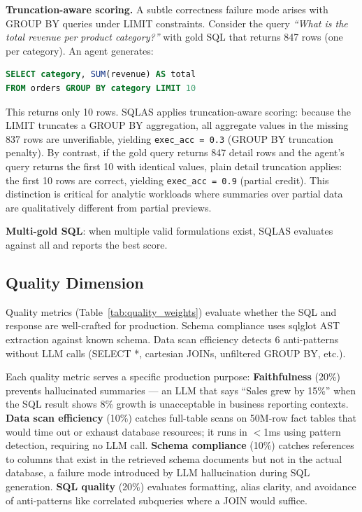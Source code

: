 \documentclass[conference]{IEEEtran}
\begin{document}
\textbf{Truncation-aware scoring.}
A subtle correctness failure mode arises with GROUP BY queries under
LIMIT constraints. Consider the query \emph{``What is the total revenue
per product category?''} with gold SQL that returns 847 rows (one per
category). An agent generates:
\begin{lstlisting}[language=SQL,basicstyle=\scriptsize\ttfamily]
SELECT category, SUM(revenue) AS total
FROM orders GROUP BY category LIMIT 10
\end{lstlisting}
This returns only 10 rows. SQLAS applies truncation-aware scoring:
because the LIMIT truncates a GROUP BY aggregation, all aggregate values
in the missing 837 rows are unverifiable, yielding \texttt{exec\_acc = 0.3}
(GROUP BY truncation penalty). By contrast, if the gold query returns
847 detail rows and the agent's query returns the first 10 with identical
values, plain detail truncation applies: the first 10 rows are correct,
yielding \texttt{exec\_acc = 0.9} (partial credit).
This distinction is critical for analytic workloads where summaries over
partial data are qualitatively different from partial previews.

\textbf{Multi-gold SQL}: when multiple valid formulations exist, SQLAS
evaluates against all and reports the best score.

\subsection{Quality Dimension}

Quality metrics (Table~\ref{tab:quality_weights}) evaluate whether the SQL
and response are well-crafted for production.
Schema compliance uses sqlglot AST extraction against known schema.
Data scan efficiency detects 6 anti-patterns without LLM calls
(SELECT *, cartesian JOINs, unfiltered GROUP BY, etc.).

Each quality metric serves a specific production purpose:
\textbf{Faithfulness} (20\%) prevents hallucinated summaries --- an LLM
that says ``Sales grew by 15\%'' when the SQL result shows 8\% growth is
unacceptable in business reporting contexts.
\textbf{Data scan efficiency} (10\%) catches full-table scans on 50M-row
fact tables that would time out or exhaust database resources; it runs
in $<$1ms using pattern detection, requiring no LLM call.
\textbf{Schema compliance} (10\%) catches references to columns that
exist in the retrieved schema documents but not in the actual database,
a failure mode introduced by LLM hallucination during SQL generation.
\textbf{SQL quality} (20\%) evaluates formatting, alias clarity, and
avoidance of anti-patterns like correlated subqueries where a JOIN
would suffice.
\end{document}
